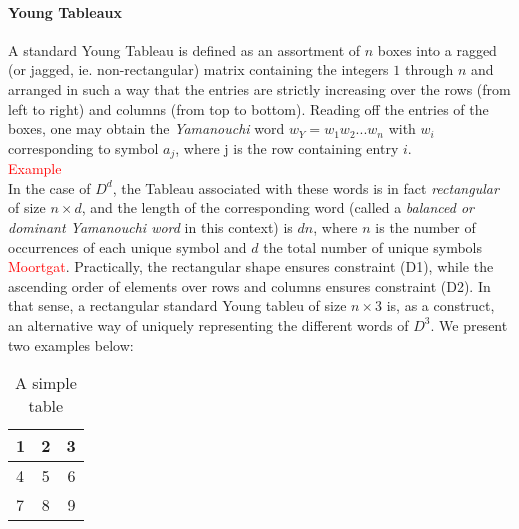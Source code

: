 \documentclass[nonatbib,numbers,10pt]{sigplanconf}
\newcommand\todo[1]{\textcolor{red}{#1}}
\begin{document}
\paragraph{Young Tableaux}
A standard Young Tableau is defined as an assortment of $n$ boxes into a ragged (or jagged, ie. non-rectangular) matrix containing the integers $1$ through $n$ and arranged in such a way that the entries are strictly increasing over the rows (from left to right) and columns (from top to bottom). Reading off the entries of the boxes, one may obtain the \textit{Yamanouchi} word $w_Y =w_1 w_2 ... w_n$ with $w_i$ corresponding to symbol $a_j$, where j is the row containing entry $i$.\\
\todo{Example}\\
In the case of $D^d$, the Tableau associated with these words is in fact \textit{rectangular} of size $n \times d$, and the length of the corresponding word (called a \textit{balanced or dominant Yamanouchi word} in this context) is $dn$, where $n$ is the number of occurrences of each unique symbol and $d$ the total number of unique symbols \todo{Moortgat}.
Practically, the rectangular shape ensures constraint (D1), while the ascending order of elements over rows and columns ensures constraint (D2). In that sense, a rectangular standard Young tableu of size $n \times 3$ is, as a construct, an alternative way of uniquely representing the different words of $D^3$. We present two examples below:\\
\begin{table}[h!]
  \centering
    \begin{tabular}{| l | c | r |}
    \hline
    1 & 2 & 3 \\
    \hline
    4 & 5 & 6 \\
    \hline
    7 & 8 & 9 \\
    \hline
    \end{tabular}
  \caption{A simple table}
\end{table}
\end{document}
